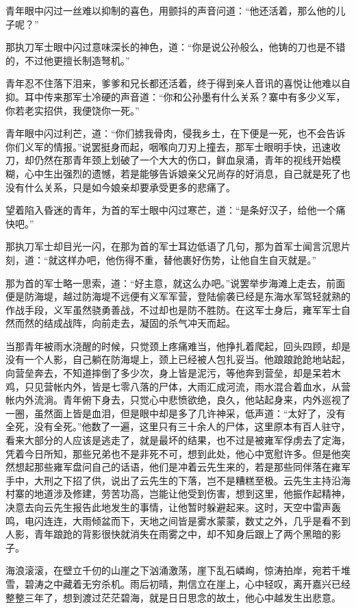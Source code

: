青年眼中闪过一丝难以抑制的喜色，用颤抖的声音问道：“他还活着，那么他的儿子呢？”

那执刀军士眼中闪过意味深长的神色，道：“你是说公孙般么，他铸的刀也是不错的，不过他更擅长制造弩机。”

青年忍不住落下泪来，爹爹和兄长都还活着，终于得到亲人音讯的喜悦让他难以自抑。耳中传来那军士冷硬的声音道：“你和公孙墨有什么关系？寨中有多少义军，你若老实招供，我便饶你一死。”

青年眼中闪过利芒，道：“你们掳我骨肉，侵我乡土，在下便是一死，也不会告诉你们义军的情报。”说罢挺身而起，咽喉向刀刃上撞去，那军士眼明手快，迅速收刀，却仍然在那青年颈上划破了一个大大的伤口，鲜血泉涌，青年的视线开始模糊，心中生出强烈的遗憾，若是能够告诉娘亲父兄尚存的好消息，自己就是死了也没有什么关系，只是如今娘亲却要承受更多的悲痛了。

望着陷入昏迷的青年，为首的军士眼中闪过寒芒，道：“是条好汉子，给他一个痛快吧。”

那执刀军士却目光一闪，在那为首的军士耳边低语了几句，那为首军士闻言沉思片刻，道：“就这样办吧，他伤得不重，替他裹好伤势，让他自生自灭就是。”

那为首的军士略一思索，道：“好主意，就这么办吧。”说罢举步海滩上走去，前面便是防海堤，越过防海堤不远便有义军军营，登陆偷袭已经是东海水军驾轻就熟的作战手段，义军虽然骁勇善战，不过却也是防不胜防。在这军士身后，雍军军士自然而然的结成战阵，向前走去，凝固的杀气冲天而起。

当那青年被雨水浇醒的时候，只觉颈上疼痛难当，他挣扎着爬起，回头四顾，却是没有一个人影，自己躺在防海堤上，颈上已经被人包扎妥当。他踉踉跄跄地站起，向营垒奔去，不知道摔倒了多少次，身上皆是泥污，等他奔到营垒，却是呆若木鸡，只见营帐内外，皆是七零八落的尸体，大雨汇成河流，雨水混合着血水，从营帐内外流淌。青年俯下身去，只觉心中悲愤欲绝，良久，他站起身来，内外巡视了一圈，虽然面上皆是血泪，但是眼中却是多了几许神采，低声道：“太好了，没有全死，没有全死。”他数了一遍，这里只有三十余人的尸体，这里原本有百人驻守，看来大部分的人应该是逃走了，就是最坏的结果，也不过是被雍军俘虏去了定海，凭着今日所知，那些兄弟也不是非死不可，想到此处，他心中宽慰许多。但是他突然想起那些雍军盘问自己的话语，他们是冲着云先生来的，若是那些同伴落在雍军手中，大刑之下招了供，说出了云先生的下落，岂不是糟糕至极。云先生主持沿海村寨的地道涉及修建，劳苦功高，岂能让他受到伤害，想到这里，他振作起精神，决意去向云先生报告此地发生的事情，让他暂时躲避起来。这时，天空中雷声轰鸣，电闪连连，大雨倾盆而下，天地之间皆是雾水蒙蒙，数丈之外，几乎是看不到人影，青年踉跄的背影很快就消失在雨雾之中，却不知身后跟上了两个黑暗的影子。

海浪滚滚，在壁立千仞的山崖之下汹涌激荡，崖下乱石嶙峋，惊涛拍岸，宛若千堆雪，碧涛之中藏着无穷杀机。雨后初晴，荆信立在崖上，心中轻叹，离开嘉兴已经整整三年了，想到渡过茫茫碧海，就是日日思念的故土，他心中越发生出悲意。

